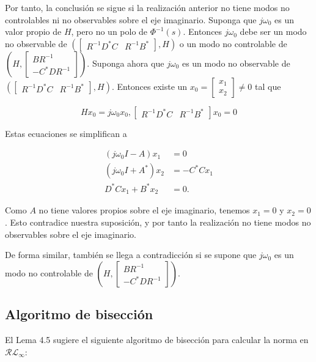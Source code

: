 Por tanto, la conclusión se sigue si la realización anterior no tiene modos no controlables ni no observables sobre el eje imaginario. Suponga que $j \omega_{0}$ es un valor propio de $H$, pero no un polo de $\Phi^{-1}(s)$. Entonces $j \omega_{0}$ debe ser un modo no observable de $\left(\left[\begin{array}{ll}R^{-1} D^{*} C & R^{-1} B^{*}\end{array}\right], H\right)$ o un modo no controlable de $\left(H,\left[\begin{array}{c}B R^{-1} \\ -C^{*} D R^{-1}\end{array}\right]\right)$. Suponga ahora que $j \omega_{0}$ es un modo no observable de $\left(\left[\begin{array}{ll}R^{-1} D^{*} C & R^{-1} B^{*}\end{array}\right], H\right)$. Entonces existe un $x_{0}=\left[\begin{array}{l}x_{1} \\ x_{2}\end{array}\right] \neq 0$ tal que

$$
H x_{0}=j \omega_{0} x_{0},\left[\begin{array}{ll}
R^{-1} D^{*} C & R^{-1} B^{*}
\end{array}\right] x_{0}=0
$$

Estas ecuaciones se simplifican a

$$
\begin{aligned}
\left(j \omega_{0} I-A\right) x_{1} & =0 \\
\left(j \omega_{0} I+A^{*}\right) x_{2} & =-C^{*} C x_{1} \\
D^{*} C x_{1}+B^{*} x_{2} & =0 .
\end{aligned}
$$

Como $A$ no tiene valores propios sobre el eje imaginario, tenemos $x_{1}=0$ y $x_{2}=0$. Esto contradice nuestra suposición, y por tanto la realización no tiene modos no observables sobre el eje imaginario.

De forma similar, también se llega a contradicción si se supone que $j \omega_{0}$ es un modo no controlable de $\left(H,\left[\begin{array}{c}B R^{-1} \\ -C^{*} D R^{-1}\end{array}\right]\right)$.

\subsection*{Algoritmo de bisección}
El Lema 4.5 sugiere el siguiente algoritmo de bisección para calcular la norma en $\mathcal{R} \mathcal{L}_{\infty}$:

